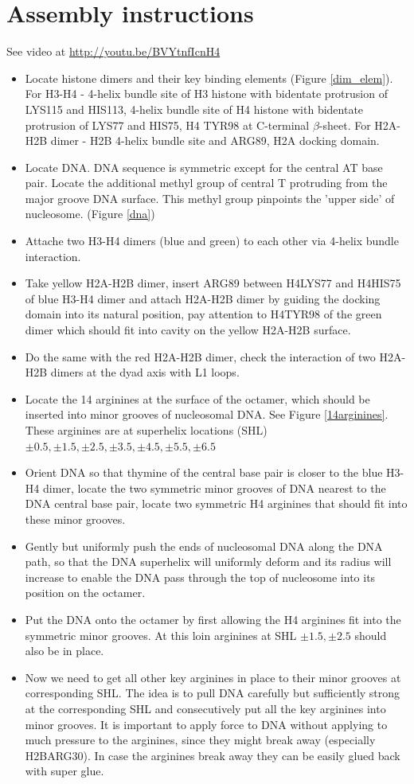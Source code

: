 \documentclass[12pt,onecolumn]{scrartcl}
\begin{document}
\section{Assembly instructions}
See video at \url{http://youtu.be/BVYtnfIcnH4}
\begin{itemize}
\item Locate histone dimers and their key binding elements (Figure \ref{dim_elem}). For H3-H4 - 4-helix bundle site of H3 histone with bidentate protrusion of LYS115 and HIS113, 4-helix bundle site of H4 histone with bidentate protrusion of LYS77 and HIS75, H4 TYR98 at C-terminal $\beta$-sheet. For H2A-H2B dimer - H2B 4-helix bundle site and ARG89, H2A docking domain.
\item Locate DNA. DNA sequence is symmetric except for the central AT base pair. Locate the additional methyl group of central T protruding from the major groove DNA surface. This methyl group pinpoints the 'upper side' of nucleosome. (Figure \ref{dna})
\item Attache two H3-H4 dimers (blue and green) to each other via 4-helix bundle interaction.
\item Take yellow H2A-H2B dimer, insert ARG89 between H4LYS77 and H4HIS75 of blue H3-H4 dimer and attach H2A-H2B dimer by guiding the docking domain into its natural position, pay attention to H4TYR98 of the green dimer which should fit into cavity on the yellow H2A-H2B surface.
\item Do the same with the red H2A-H2B dimer, check the interaction of two H2A-H2B dimers at the dyad axis with L1 loops.
\item Locate the 14 arginines at the surface of the octamer, which should be inserted into minor grooves of nucleosomal DNA. See Figure \ref{14arginines}. These arginines are at superhelix locations (SHL) $\pm0.5,\pm1.5,\pm2.5,\pm3.5,\pm4.5,\pm5.5,\pm6.5$
\item Orient DNA so that thymine of the central base pair is closer to the blue H3-H4 dimer, locate the two symmetric minor grooves of DNA nearest to the DNA central base pair, locate two symmetric H4 arginines that should fit into these minor grooves.
\item Gently but uniformly push the ends of nucleosomal DNA along the DNA path, so that the DNA superhelix will uniformly deform and its radius will increase to enable the DNA pass through the top of nucleosome into its position on the octamer.
\item Put the DNA onto the octamer by first allowing the H4 arginines fit into the symmetric minor grooves. At this loin arginines at SHL $\pm1.5,\pm2.5$ should also be in place.
\item Now we need to get all other key arginines in place to their minor grooves at corresponding SHL. The idea is to pull DNA carefully but sufficiently strong at the corresponding SHL and consecutively put all the key arginines into minor grooves. It is important to apply force to DNA without applying to much pressure to the arginines, since they might break away (especially H2BARG30). In case the arginines break away they can be easily glued back with super glue.
\end{itemize}
\end{document}
